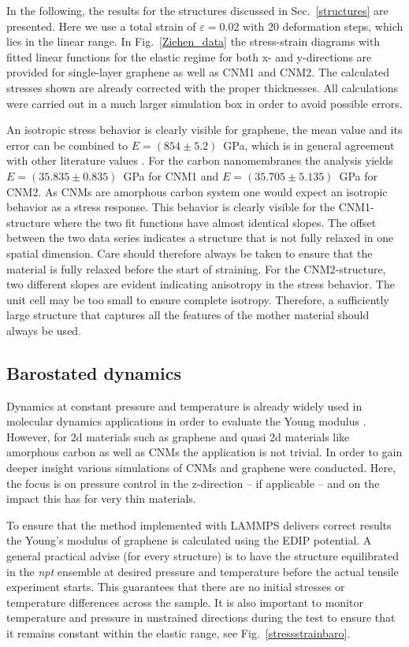\documentclass[preprint,12pt]{elsarticle}
\newcommand{\figref}[1]{Fig.~\protect\ref{#1}}
\begin{document}
In the following, the results for the structures discussed in Sec.~\ref{structures} are presented. 
Here we use a total strain of $\varepsilon=0.02$ with 20 deformation steps, which lies in the linear range. 
In \figref{Ziehen_data} the stress-strain diagrams with fitted linear functions for the elastic regime 
for both x- and y-directions are provided for single-layer graphene as well as CNM1 and CNM2.
The calculated stresses shown are already corrected with the proper thicknesses. 
All calculations were carried out in a much 
larger simulation box in order to avoid possible errors. 

An isotropic stress behavior is clearly visible for graphene, 
the mean value and its error can be combined 
to 
$E=(854\pm 5.2)$~GPa, which is in general agreement with other literature values \cite{MFD:SuM15}. 
For the carbon nanomembranes the analysis yields 
$E=(35.835\pm 0.835)$~GPa for CNM1 and 
$E=(35.705\pm 5.135)$~GPa for CNM2. As CNMs are amorphous carbon system 
one would expect an isotropic behavior as a stress response. This behavior is 
clearly visible for the CNM1-structure where the two fit functions have
almost identical slopes. The offset between the two data series indicates a 
structure that is not fully relaxed in one spatial dimension. 
Care should therefore always be taken to ensure that the material is 
fully relaxed before the start of straining. 
For the CNM2-structure, two different slopes are evident 
indicating anisotropy in the stress behavior. 
The unit cell may be too small to ensure complete isotropy. 
Therefore, a sufficiently large structure that captures all the features 
of the mother material should always be used. 



\subsection{Barostated dynamics}
\label{sec-3-3}

Dynamics at constant pressure and temperature is already widely used in molecular dynamics applications
in order to evaluate the Young modulus \cite{CDB:MS17}. 
However, for 2d materials such as graphene and quasi 2d materials like amorphous carbon 
as well as CNMs 
the application is not trivial. In order to gain deeper insight
various simulations of CNMs and graphene were conducted. Here, the focus is on pressure 
control in the z-direction -- if applicable -- and on the impact this has for
very thin materials.

To ensure that the method implemented with LAMMPS delivers correct results 
the Young's modulus of graphene is calculated using the EDIP potential. 
A general practical advise (for every structure) 
is to have the structure equilibrated in the \textit{npt} ensemble 
at desired pressure and temperature before the actual tensile experiment starts.
This guarantees that there are no initial stresses or temperature differences across the sample. 
It is also important to monitor temperature and pressure in unstrained directions 
during the test to ensure that it remains constant within the elastic range, see \figref{stressstrainbaro}. 
\end{document}
